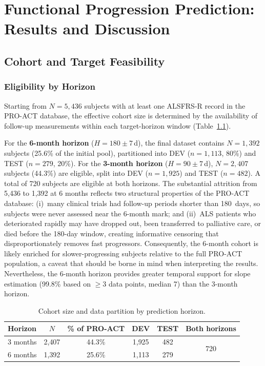 \chapter{Functional Progression Prediction: Results and Discussion}
\label{ch:study1_results}

\section{Cohort and Target Feasibility}
\label{sec:results_cohort}

\subsection{Eligibility by Horizon}
\label{subsec:results_eligibility}
Starting from $N\!=\!5{,}436$ subjects with at least one ALSFRS-R record in the PRO-ACT database, the effective cohort size is determined by the availability of follow-up measurements within each target-horizon window (Table~\ref{tab:eligibility}).

For the \textbf{6-month horizon} ($H\!=\!180 \pm 7$\,d), the final dataset contains $N\!=\!1{,}392$ subjects (25.6\% of the initial pool), partitioned into DEV ($n\!=\!1{,}113$, 80\%) and TEST ($n\!=\!279$, 20\%).
For the \textbf{3-month horizon} ($H\!=\!90 \pm 7$\,d), $N\!=\!2{,}407$ subjects (44.3\%) are eligible, split into DEV ($n\!=\!1{,}925$) and TEST ($n\!=\!482$).
A total of 720 subjects are eligible at both horizons.
The substantial attrition from 5{,}436 to 1{,}392 at 6 months reflects two structural properties of the PRO-ACT database:
(i)~many clinical trials had follow-up periods shorter than 180~days, so subjects were never assessed near the 6-month mark;
and (ii)~ALS patients who deteriorated rapidly may have dropped out, been transferred to palliative care, or died before the 180-day window, creating informative censoring that disproportionately removes fast progressors.
Consequently, the 6-month cohort is likely enriched for slower-progressing subjects relative to the full PRO-ACT population, a caveat that should be borne in mind when interpreting the results.
Nevertheless, the 6-month horizon provides greater temporal support for slope estimation (99.8\% based on $\geq 3$ data points, median 7) than the 3-month horizon.

\begin{table}[ht!]
\centering
\caption[Cohort size by prediction horizon]{Cohort size and data partition by prediction horizon.}
\label{tab:eligibility}
\small
\begin{tabular}{lccccc}
\toprule
Horizon & $N$ & \% of PRO-ACT & DEV & TEST & Both horizons \\
\midrule
3 months & 2{,}407 & 44.3\% & 1{,}925 & 482 & \multirow{2}{*}{720} \\
6 months & 1{,}392 & 25.6\% & 1{,}113 & 279 & \\
\bottomrule
\end{tabular}
\end{table}

